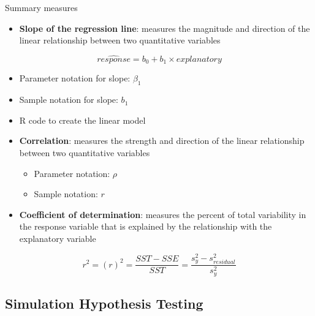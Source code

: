 \documentclass[
]{report}
\newenvironment{Shaded}{\begin{snugshade}}{\end{snugshade}}
\newcommand{\AttributeTok}[1]{\textcolor[rgb]{0.13,0.29,0.53}{#1}}
\newcommand{\CommentTok}[1]{\textcolor[rgb]{0.56,0.35,0.01}{\textit{#1}}}
\newcommand{\DecValTok}[1]{\textcolor[rgb]{0.00,0.00,0.81}{#1}}
\newcommand{\FunctionTok}[1]{\textcolor[rgb]{0.13,0.29,0.53}{\textbf{#1}}}
\newcommand{\NormalTok}[1]{#1}
\newcommand{\OtherTok}[1]{\textcolor[rgb]{0.56,0.35,0.01}{#1}}
\newcommand{\SpecialCharTok}[1]{\textcolor[rgb]{0.81,0.36,0.00}{\textbf{#1}}}
\providecommand{\tightlist}{%
  \setlength{\itemsep}{0pt}\setlength{\parskip}{0pt}}
\begin{document}
Summary measures

\begin{itemize}
\tightlist
\item
  \textbf{Slope of the regression line}: measures the magnitude and direction of the linear relationship between two quantitative variables
\end{itemize}

\[\widehat{response} = b_0 + b_1 \times explanatory\]
\vspace{1mm}

\begin{itemize}
\item
  Parameter notation for slope: \(\beta_1\)
\item
  Sample notation for slope: \(b_1\)
\item
  R code to create the linear model
\end{itemize}

\begin{Shaded}
\end{Shaded}

\begin{itemize}
\item
  \textbf{Correlation}: measures the strength and direction of the linear relationship between two quantitative variables

  \begin{itemize}
  \item
    Parameter notation: \(\rho\)
  \item
    Sample notation: \(r\)
  \end{itemize}
\item
  \textbf{Coefficient of determination}: measures the percent of total variability in the response variable that is explained by the relationship with the explanatory variable
\end{itemize}

\[r^2 = (r)^2 = \frac{SST - SSE}{SST} = \frac{s^2_y - s^2_{residual}}{s^2_y}\]

\subsection*{Simulation Hypothesis Testing}\label{simulation-hypothesis-testing-2}
\end{document}
